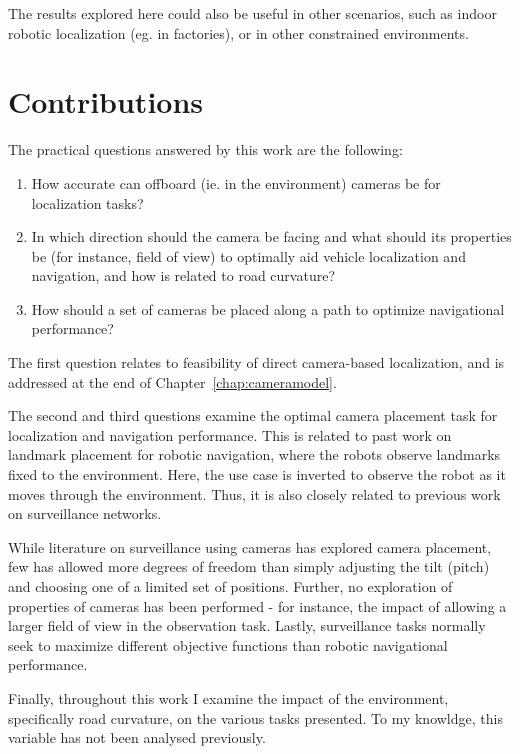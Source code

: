 \documentclass[a4paper,12pt,twoside,openright]{report}
\begin{document}
The results explored here could also be useful in other scenarios, such as indoor
robotic localization (eg. in factories), or in other constrained environments.

\section{Contributions}

The practical questions answered by this work are the following:
\begin{enumerate}
    \item How accurate can offboard (ie. in the environment) cameras be for localization tasks?
    \item In which direction should the camera be facing and what should its properties be (for instance, field of view)
          to optimally aid vehicle localization and navigation, and how is related to road curvature?
    \item How should a set of cameras be placed along a path to optimize navigational performance?
\end{enumerate}

The first question relates to feasibility of direct camera-based localization,
and is addressed at the end of Chapter~\ref{chap:cameramodel}.

The second and third questions examine the optimal camera placement task 
for localization and navigation performance. This is related to past work 
on landmark placement for robotic navigation, where the robots observe landmarks fixed to the environment. 
Here, the use case is inverted to observe the robot as it moves through the environment. 
Thus, it is also closely related to previous work on surveillance networks.

While literature on surveillance using cameras has explored camera placement, few
has allowed more degrees of freedom than simply adjusting the tilt (pitch) 
and choosing one of a limited set of positions. Further, no exploration of 
properties of cameras has been performed - for instance, the impact
of allowing a larger field of view in the observation task. Lastly, surveillance
tasks normally seek to maximize different objective functions than robotic
navigational performance.

Finally, throughout this work I examine the impact of the environment, specifically
road curvature, on the various tasks presented. To my knowldge, this variable has not been
analysed previously.
\end{document}

